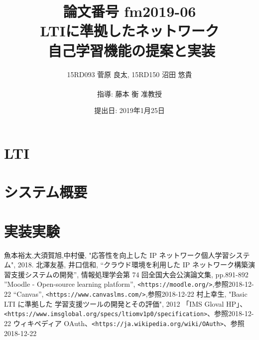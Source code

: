 \documentclass[11pt, a4paper]{jarticle}
\title{\LARGE 論文番号 fm2019-06\\ \Huge LTIに準拠したネットワーク\\自己学習機能の提案と実装}
\author{15RD093 菅原 良太, 15RD150 沼田 悠貴\\ \\指導: 藤本 衡 准教授}
\date{提出日: 2019年1月25日}
\begin{document}
\pagestyle{normal}
\maketitle
\thispagestyle{normal}
\clearpage


\fontsize{11pt}{28pt}\selectfont


\clearpage

\tableofcontents
\clearpage


\clearpage

%

\section{LTI}

%
%
%

\clearpage

\section{システム概要}




\clearpage

\section{実装実験}

\clearpage


\clearpage



\clearpages


\begin{thebibliography}{9999}
   魚本裕太,大須賀旭,中村優, "応答性を向上した
IP ネットワーク個人学習システム", 2018.
   北澤友基, 井口信和, “クラウド環境を利用した IP ネットワーク構築演習支援システムの開発”, 情報処理学会第 74 回全国大会公演論文集, pp.891-892
   ”Moodle - Open-source learning platform”, \texttt{<https://moodle.org/>},参照2018-12-22
   “Canvas”, \texttt{<https://www.canvaslms.com/>},参照2018-12-22
   村上幸生, "Basic LTI に準拠した 学習支援ツールの開発とその評価", 2012
   「IMS Gloval HP」、\texttt{<https://www.imsglobal.org/specs/ltiomv1p0/specification>}、参照2018-12-22
  ウィキペディア OAuth、\texttt{<https://ja.wikipedia.org/wiki/OAuth>}、参照2018-12-22
\end{thebibliography}
\end{document}

